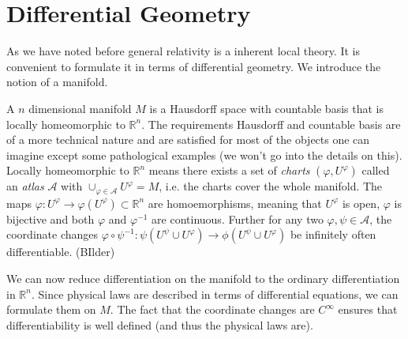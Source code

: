 \chapter{Differential Geometry}
As we have noted before general relativity is a inherent local theory. It is convenient to formulate it in terms of differential geometry.
We introduce the notion of a manifold.\par
A $n$ dimensional manifold $M$ is a Hausdorff space with countable basis that is locally homeomorphic to $\mathbb{R}^n$. 
The requirements Hausdorff and countable basis are of a more technical nature and are satisfied for most of the objects one can imagine 
except some pathological examples (we won't go into the details on this).
Locally homeomorphic to $\mathbb{R}^n$ means there exists a set of \emph{charts} 
$(\varphi,U^\varphi)$ called an \emph{atlas} $\mathcal{A}$ with $\cup_{\varphi\in\mathcal{A}} U^\varphi =M$, 
i.e. the charts cover the whole manifold. The maps $\varphi:U^\varphi\to \varphi(U^\varphi)\subset\mathbb{R}^n $ are homoemorphisms, 
meaning that $U^\varphi$ is open, $\varphi$ is bijective and both $\varphi$ and $\varphi^{-1}$ are continuous.
Further for any two $\varphi,\psi\in \mathcal{A}$, the coordinate changes 
$\varphi\circ\psi^{-1}:\psi(U^\psi\cup U^\varphi)\to \phi(U^\psi\cup U^\varphi)$ be infinitely often differentiable.
(BIlder)

We can now reduce differentiation on the manifold to the ordinary differentiation in $\mathbb{R}^n$. 
Since physical laws are described in terms of differential equations, we can formulate them on $M$. 
The fact that the coordinate changes are $C^\infty$ ensures that differentiability is well defined (and thus the physical laws are).

